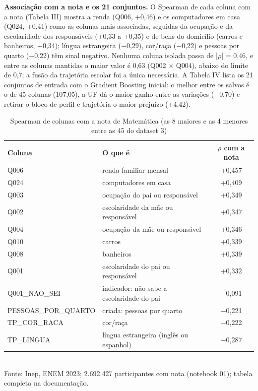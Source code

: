 \documentclass[conference,a4paper]{IEEEtran}
\begin{document}
\textbf{Associação com a nota e os 21 conjuntos.} O Spearman \cite{spearman} de cada coluna com a nota (Tabela III) mostra a renda (Q006, +0,46) e os computadores em casa (Q024, +0,41) como as colunas mais associadas, seguidas da ocupação e da escolaridade dos responsáveis (+0,33 a +0,35) e de bens do domicílio (carros e banheiros, +0,34); língua estrangeira ($-$0,29), cor/raça ($-$0,22) e pessoas por quarto ($-$0,22) têm sinal negativo. Nenhuma coluna isolada passa de |$\rho$| = 0,46, e entre as colunas mantidas o maior valor é 0,63 (Q002 $\times$ Q004), abaixo do limite de 0,7; a fusão da trajetória escolar foi a única necessária. A Tabela IV lista os 21 conjuntos de entrada com o Gradient Boosting inicial: o melhor entre os salvos é o de 45 colunas (107,05), a UF dá o maior ganho entre as variações ($-$0,70) e retirar o bloco de perfil e trajetória o maior prejuízo (+4,42).

\begin{table}[!t]
\caption{Spearman de colunas com a nota de Matemática (as 8 maiores e as 4 menores entre as 45 do dataset 3)}
\centering\footnotesize
\begin{tabularx}{\textwidth}{l>{\raggedright\arraybackslash}Xc}
\toprule
\textbf{Coluna} & \textbf{O que é} & \textbf{$\rho$ com a nota} \\
\midrule
Q006 & renda familiar mensal & +0,457 \\
Q024 & computadores em casa & +0,409 \\
Q003 & ocupação do pai ou responsável & +0,349 \\
Q002 & escolaridade da mãe ou responsável & +0,347 \\
Q004 & ocupação da mãe ou responsável & +0,346 \\
Q010 & carros & +0,339 \\
Q008 & banheiros & +0,339 \\
Q001 & escolaridade do pai ou responsável & +0,332 \\
Q001\_NAO\_SEI & indicador: não sabe a escolaridade do pai & $-$0,091 \\
PESSOAS\_POR\_QUARTO & criada: pessoas por quarto & $-$0,221 \\
TP\_COR\_RACA & cor/raça & $-$0,222 \\
TP\_LINGUA & língua estrangeira (inglês ou espanhol) & $-$0,287 \\
\bottomrule
\end{tabularx}
\\[2pt]{\scriptsize Fonte: Inep, ENEM 2023; 2.692.427 participantes com nota (notebook 01); tabela completa na documentação.}
\end{table}
\end{document}
